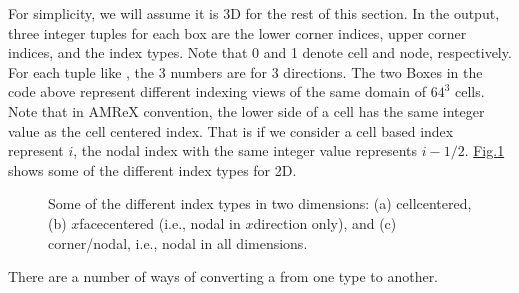 \documentclass[letterpaper,10pt,english]{sphinxmanual}
\begin{document}
\sphinxAtStartPar
For simplicity, we will assume it is 3D for the rest of this section.  In the
output, three integer tuples for each box are the lower corner indices, upper
corner indices, and the index types. Note that 0 and 1 denote cell and node,
respectively. For each tuple like , the 3 numbers are for 3
directions. The two Boxes in the code above represent different indexing views
of the same domain of \(64^3\) cells. Note that in AMReX convention, the
lower side of a cell has the same integer value as the cell centered index.
That is if we consider a cell based index represent \(i\), the nodal index
with the same integer value represents \(i-1/2\).
\hyperref[\detokenize{Basics:fig-basics-indextypes}]{Fig.\@ \ref{\detokenize{Basics:fig-basics-indextypes}}} shows some of the different index types for 2D.

\begin{center}

\begin{figure}[htbp]
\centering
\capstart

\noindent{}
\caption{Some of the different index types in two dimensions: (a) cell\sphinxhyphen{}centered, (b) \(x\)\sphinxhyphen{}face\sphinxhyphen{}centered
(i.e., nodal in \(x\)\sphinxhyphen{}direction only), and (c) corner/nodal,
i.e., nodal in all dimensions.}\label{\detokenize{Basics:id2}}\label{\detokenize{Basics:fig-basics-indextypes}}\end{figure}

\end{center}

\sphinxAtStartPar
There are a number of ways of converting a  from one type to another.
\end{document}
